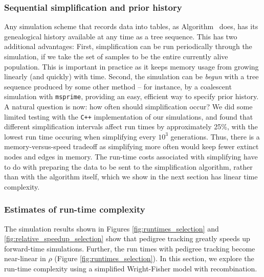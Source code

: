\documentclass{article}
\newcommand{\cpp}{\texttt{C++}}
\newcommand{\msprime}{\texttt{msprime}}
\newcommand{\krt}[1]{{\em \color{green} #1}}
\begin{document}
\subsubsection*{Sequential simplification and prior history}
\label{ss:seq_simp}

Any simulation scheme that records data into tables,
as Algorithm~ does,
has its genealogical history available at any time as a tree sequence.
This has two additional advantages:
First, simplification can be run periodically through the simulation,
if we take the set of samples to be the entire currently alive population.
This is important in practice as it keeps memory usage from growing linearly (and quickly) with time.
Second, the simulation can
be \emph{begun} with a tree sequence produced by some other method -- for
instance, by a coalescent simulation with \msprime,
providing an easy, efficient way to specify prior history.
A natural question is now: how often should simplification occur?  We did some limited testing with the \cpp{}
implementation of our simulations, and found that different simplification intervals affect run times by approximately
25\%, with the lowest run time occuring when simplifying every $10^3$ generations.  Thus, there is a memory-versus-speed
tradeoff as simplifying more often would keep fewer extinct nodes and edges in memory.  The run-time costs associated
with simplifying have to do with preparing the data to be sent to the simplification algorithm, rather than with the
algorithm itself, which we show in the next section has linear time complexity.

%



\subsubsection*{Estimates of run-time complexity}

The simulation results shown in Figures \ref{fig:runtimes_selection} and \ref{fig:relative_speedup_selection} show that
pedigree tracking greatly speeds up forward-time simulations.  Further, the run times with pedigree tracking become
near-linear in $\rho$ (Figure \ref{fig:runtimes_selection}).  In this section, we explore the run-time complexity using a
simplified Wright-Fisher model with recombination.
\end{document}
